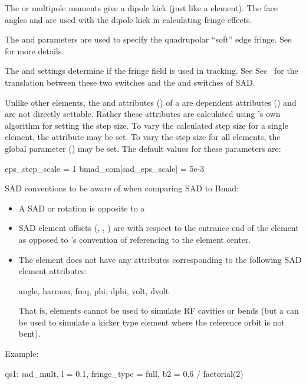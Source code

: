 {The  or  multipole moments give a dipole kick (just like a  element). The
face angles  and  are used with the dipole kick in calculating fringe effects.

The  and  parameters are used to specify the quadrupolar ``soft'' edge fringe. See
 for more details.

The  and  settings determine if the fringe field is used in
tracking. See Sec~ for the translation between these two switches and the
 and  switches of SAD.

Unlike other elements, the  and  attributes () of a 
are dependent attributes () and are not directly settable. Rather these
attributes are calculated using 's own algorithm for setting the step size. To
vary the calculated step size for a single  element, the attribute
 may be set.  To vary the step size for all  elements, the
global parameter  () may be set.
The default values for these parameters are:
\begin{example}
  eps_step_scale          = 1
  bmad_com[sad_eps_scale] = 5e-3
\end{example}

SAD conventions to be aware of when comparing SAD to Bmad:
\begin{itemize}
\item
A SAD  or  rotation is opposite to a \bmad {}
\item
SAD element offsets (, , ) are with respect to the entrance end
of the element as opposed to \bmad's convention of referencing to the element center.
\item
  The \bmad {} element does not have any attributes corresponding to the following
SAD  element attributes:
\begin{example}
  angle, harmon, freq, phi, dphi, volt, dvolt
\end{example}
That is,  elements cannot be used to simulate RF cavities or bends (but a 
can be used to simulate a kicker type element where the reference orbit is not bent).
\end{itemize}

Example:
\begin{example}
  qs1: sad_mult, l = 0.1, fringe_type = full, b2 = 0.6 / factorial(2)
\end{example}

}
